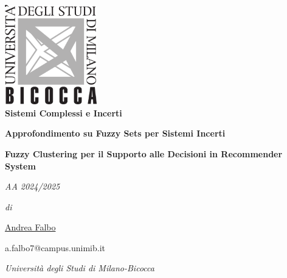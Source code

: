 \documentclass[12pt,a4paper,twoside,openany]{book}
\begin{document}
 

\begin{center}
\includegraphics[width=0.3\textwidth]{Immagini/logo_bicocca.png}\\

\vspace*{2\baselineskip}
{\huge \textbf{Sistemi Complessi e Incerti}}

\vspace*{1\baselineskip}
{\large \textbf{Approfondimento su Fuzzy Sets per Sistemi Incerti}}

\vspace*{3\baselineskip}
{\Large \textbf{Fuzzy Clustering per il Supporto alle Decisioni in Recommender System}}

\vspace*{8\baselineskip}
{\large \textbf{}}

\begin{large}
\vspace*{2\baselineskip}

\emph{AA 2024/2025}

\vspace*{2\baselineskip}

\emph{di} \\
{\Large \href{https://github.com/LilQuacky}{\faGithub{} Andrea Falbo} \par}
{{ a.falbo7@campus.unimib.it}}\\ [1cm]

\vspace*{1\baselineskip}
{\large{\emph{Università degli Studi di Milano-Bicocca}}\par}

\thispagestyle{empty}
\end{large}
\end{center}

\pagebreak



\tableofcontents 

\newpage 


\setcounter{chapter}{0} 







\appendix


\backmatter
\sloppy 
\printbibliography[heading=bibintoc, title=Bibliografia]

\newpage 
\end{document}
